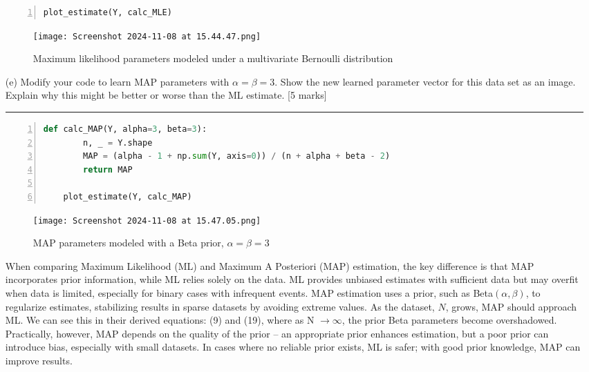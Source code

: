 \documentclass{article}
\begin{document}
\begin{enumerate}
\begin{lstlisting}[language=Python, numbers=left, frame=single, breaklines=true]
    plot_estimate(Y, calc_MLE)
    \end{lstlisting}



    \begin{figure}[H]
        \centering
        \texttt{[image: Screenshot 2024-11-08 at 15.44.47.png]}
        \caption{Maximum likelihood parameters modeled under a multivariate Bernoulli distribution}
        \label{fig:enter-label}
    \end{figure}

    \item[(e)] Modify your code to learn MAP parameters with $\alpha = \beta = 3$. Show the new learned parameter vector for this data set as an image. Explain why this might be better or worse than the ML estimate. [5 marks]

    \noindent\textcolor{gray}{\rule{0.1\linewidth}{0.4pt}}

    \vspace{10pt}


    \begin{lstlisting}[language=Python, numbers=left, frame=single, breaklines=true]
    def calc_MAP(Y, alpha=3, beta=3):
        n, _ = Y.shape
        MAP = (alpha - 1 + np.sum(Y, axis=0)) / (n + alpha + beta - 2)
        return MAP
    
    plot_estimate(Y, calc_MAP)
    \end{lstlisting}


    
    \begin{figure}[H]
        \centering
        \texttt{[image: Screenshot 2024-11-08 at 15.47.05.png]}
        \caption{MAP parameters modeled with a Beta prior, $\alpha = \beta = 3$}
        \label{fig:enter-label}
    \end{figure}

    When comparing Maximum Likelihood (ML) and Maximum A Posteriori (MAP) estimation, the key difference is that MAP incorporates prior information, while ML relies solely on the data. ML provides unbiased estimates with sufficient data but may overfit when data is limited, especially for binary cases with infrequent events. MAP estimation uses a prior, such as Beta$(\alpha,\beta)$, to regularize estimates, stabilizing results in sparse datasets by avoiding extreme values. As the dataset, $N$, grows, MAP should approach ML. We can see this in their derived equations: (9) and (19), where as N $\to \infty$, the prior Beta parameters become overshadowed. Practically, however, MAP depends on the quality of the prior – an appropriate prior enhances estimation, but a poor prior can introduce bias, especially with small datasets. In cases where no reliable prior exists, ML is safer; with good prior knowledge, MAP can improve results.
        
    \end{enumerate}
    
\end{document}
